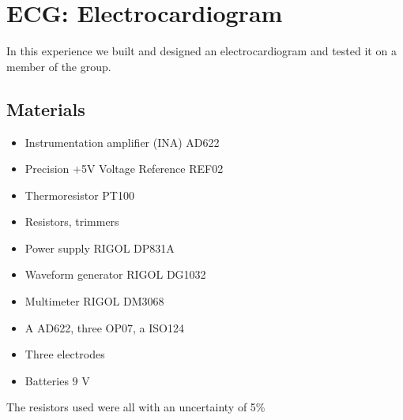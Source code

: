\chapter{ECG: Electrocardiogram}
In this experience we built and designed an electrocardiogram and tested it on a member of the group.

\section{Materials}
\begin{itemize}
\item Instrumentation amplifier (INA) AD622
\item Precision +5V Voltage Reference REF02
\item Thermoresistor PT100
\item Resistors, trimmers
\item Power supply RIGOL DP831A
\item Waveform generator RIGOL DG1032
\item Multimeter RIGOL DM3068
\item A AD622, three OP07, a ISO124
\item Three electrodes
\item Batteries $9$ V
\end{itemize}
The resistors used were all with an uncertainty of 5\%
